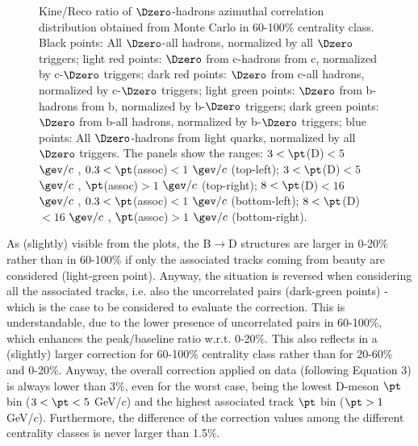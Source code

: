 \begin{figure}
\caption{Kine/Reco ratio of $\Dzero$-hadrons azimuthal correlation distribution obtained from Monte Carlo in 60-100$\%$ centrality class. Black points: All $\Dzero$-all hadrons, normalized by all $\Dzero$ triggers; light red points: $\Dzero$ from c-hadrons from c, normalized by c-$\Dzero$ triggers; dark red points: $\Dzero$ from c-all hadrons, normalized by c-$\Dzero$ triggers; light green points: $\Dzero$ from b-hadrons from b, normalized by b-$\Dzero$ triggers; dark green points: $\Dzero$ from b-all hadrons, normalized by b-$\Dzero$ triggers; blue points: All $\Dzero$-hadrons from light quarks, normalized by all $\Dzero$ triggers.
The panels show the ranges: $3 < \pt$(D)$ < 5$ $\gev/c$ , $0.3 < \pt$(assoc)$ < 1$ $\gev/c$  (top-left); $3 < \pt$(D)$ < 5$ $\gev/c$ , $\pt$(assoc)$ > 1$ $\gev/c$  (top-right); $8 < \pt$(D)$ < 16$ $\gev/c$ , $0.3 < \pt$(assoc)$ < 1$ $\gev/c$  (bottom-left); $8 < \pt$(D)$ < 16$ $\gev/c$ , $\pt$(assoc)$ > 1$ $\gev/c$  (bottom-right).}
\label{fig:MC_Kine_60100}
\end{figure}

As (slightly) visible from the plots, the B$\rightarrow$D structures are larger in 0-20\% rather than in 60-100\% if only the associated tracks coming from beauty are considered (light-green point). Anyway, the situation is reversed when considering all the associated tracks, i.e. also the uncorrelated pairs (dark-green points) - which is the case to be considered to evaluate the correction. This is understandable, due to the lower presence of uncorrelated pairs in 60-100\%, which enhances the peak/baseline ratio w.r.t. 0-20\%. This also reflects in a (slightly) larger correction for 60-100\% centrality class rather than for 20-60\% and 0-20\%.
Anyway, the overall correction applied on data (following Equation 3) is always lower than 3\%, even for the worst case, being the lowest D-meson $\pt$ bin ($3 < \pt < 5$ GeV/$c$) and the highest associated track $\pt$ bin ($\pt > 1$ GeV/$c$).
Furthermore, the difference of the correction values among the different centrality classes is never larger than 1.5\%.

